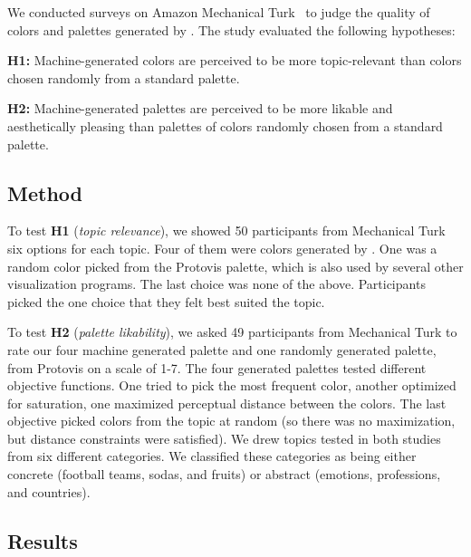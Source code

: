 We conducted surveys on Amazon Mechanical Turk~\cite{mturk} to judge the quality of colors and palettes generated by \system. The study evaluated the following hypotheses:

\textbf{H1:} Machine-generated colors are perceived to be more topic-relevant than colors chosen randomly from a standard palette.

\textbf{H2:} Machine-generated palettes are perceived to be more likable and aesthetically pleasing than palettes of colors randomly chosen from a standard palette. 

\subsection{Method}
To test \textbf{H1} (\textit{topic relevance}), we showed 50 participants from Mechanical Turk six options for each topic. Four of them were colors generated by \system. One was a random color picked from the Protovis palette, which is also used by several other visualization programs. The last choice was none of the above. Participants picked the one choice that they felt best suited the topic.

To test \textbf{H2} (\textit{palette likability}), we asked 49 participants from Mechanical Turk to rate our four machine generated palette and one randomly generated palette, from Protovis on a scale of 1-7.
The four generated palettes tested different objective functions. One tried to pick the most frequent color, another optimized for saturation, one maximized perceptual distance between the colors. The last objective picked colors from the topic at random (so there was no maximization, but distance constraints were satisfied). 
We drew topics tested in both studies from six different categories. We classified these categories as being either concrete (football teams, sodas, and fruits) or abstract (emotions, professions, and countries).

\subsection{Results}
